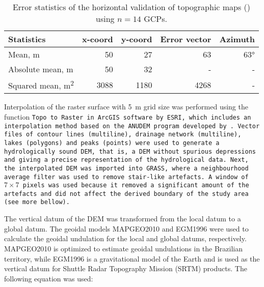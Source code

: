 \begin{table}[ht]
 \caption{Error statistics of the horizontal validation of topographic maps () using $n = 14$ 
 GCPs.}
 \label{tab:chap05-covar-data-topomap-geo-val}
 \centering
 {\small
 \begin{tabular}{lrrrr}
  \hline
  Statistics                    & x-coord & y-coord & Error vector & Azimuth  \\
  \hline
  Mean, \si{\m}                 & 50      & 27      & 63           & \ang{63} \\ 
  Absolute mean, \si{\m}        & 50      & 32      & -            & -        \\ 
  Squared mean, \si{\m\squared} & 3088    & 1180    & 4268         & -        \\ 
  \hline
 \end{tabular}}
\end{table}


Interpolation of the raster surface with \SI{5}{\metre} grid size was performed using the function \tt{Topo 
to Raster} in ArcGIS\textregistered{} software by ESRI, which includes an interpolation method based on the 
ANUDEM program developed by . Vector files of contour lines (\tt{multiline}), 
drainage network (\tt{multiline}), lakes (\tt{polygons}) and peaks (\tt{points}) were used to generate a 
hydrologically sound DEM, that is, a DEM without spurious depressions and giving a precise representation 
of the hydrological data. Next, the interpolated DEM was imported into GRASS, where a neighbourhood average 
filter was used to remove stair-like artefacts. A window of $7 \times 7$ pixels was used because it removed a 
significant amount of the artefacts and did not affect the derived boundary of the study area (see more 
bellow).

The vertical datum of the DEM was transformed from the local datum to a global datum. The geoidal models 
MAPGEO2010 \cite{IBGE2010a} and EGM1996 \cite{LemoineEtAl1998} were used to calculate the geoidal undulation 
for the local and global datums, respectively. MAPGEO2010 is optimized to estimate geoidal undulations in the 
Brazilian territory, while EGM1996 is a gravitational model of the Earth and is used as the vertical datum for 
Shuttle Radar Topography Mission (SRTM) products. The following equation was used:

